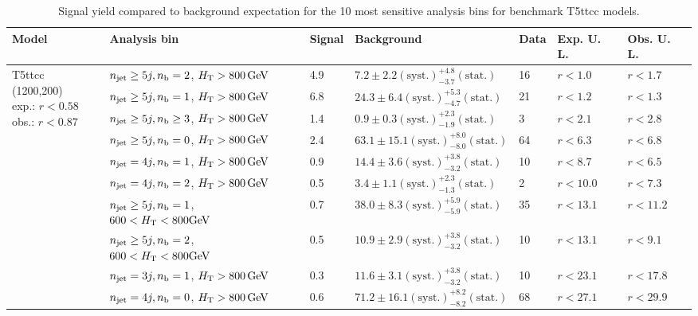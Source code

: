 \begin{table}[h!] 
  \scriptsize
  \caption{ 
Signal yield compared to background expectation for the 10 most sensitive analysis bins 
for benchmark T5ttcc models.
  \label{tab:sigBenchmarksYields_T5ttcc}}
  \centering 
  \begin{tabular}{ lllllll } 
    \hline 
    \hline 
    Model & Analysis bin & Signal & Background & Data & Exp. U. L. & Obs. U. L. \\ \hline
\multirow{10}{*}{\parbox[t]{2cm}{T5ttcc (1200,200)\\exp.: $r<0.58$\\obs.: $r<0.87$}}
 & $n_{\mathrm{jet}} \geq5j,n_{\text{b}} =2$, $\mbox{$H_\text{T}$} > 800 \, \mathrm{GeV}$ & 4.9 & $7.2 \pm 2.2 \mathrm{(syst.)} ^{+4.8}_{-3.7} \mathrm{(stat.)}$ & 16 & $r < 1.0$ & $r < 1.7$\\ 
 & $n_{\mathrm{jet}} \geq5j,n_{\text{b}} =1$, $\mbox{$H_\text{T}$} > 800 \, \mathrm{GeV}$ & 6.8 & $24.3 \pm 6.4 \mathrm{(syst.)} ^{+5.3}_{-4.7} \mathrm{(stat.)}$ & 21 & $r < 1.2$ & $r < 1.3$\\ 
 & $n_{\mathrm{jet}} \geq5j,n_{\text{b}} \geq3$, $\mbox{$H_\text{T}$} > 800 \, \mathrm{GeV}$ & 1.4 & $0.9 \pm 0.3 \mathrm{(syst.)} ^{+2.3}_{-1.9} \mathrm{(stat.)}$ & 3 & $r < 2.1$ & $r < 2.8$\\ 
 & $n_{\mathrm{jet}} \geq5j,n_{\text{b}} =0$, $\mbox{$H_\text{T}$} > 800 \, \mathrm{GeV}$ & 2.4 & $63.1 \pm 15.1 \mathrm{(syst.)} ^{+8.0}_{-8.0} \mathrm{(stat.)}$ & 64 & $r < 6.3$ & $r < 6.8$\\ 
 & $n_{\mathrm{jet}} =4j,n_{\text{b}} =1$, $\mbox{$H_\text{T}$} > 800 \, \mathrm{GeV}$ & 0.9 & $14.4 \pm 3.6 \mathrm{(syst.)} ^{+3.8}_{-3.2} \mathrm{(stat.)}$ & 10 & $r < 8.7$ & $r < 6.5$\\ 
 & $n_{\mathrm{jet}} =4j,n_{\text{b}} =2$, $\mbox{$H_\text{T}$} > 800 \, \mathrm{GeV}$ & 0.5 & $3.4 \pm 1.1 \mathrm{(syst.)} ^{+2.3}_{-1.3} \mathrm{(stat.)}$ & 2 & $r < 10.0$ & $r < 7.3$\\ 
 & $n_{\mathrm{jet}} \geq5j,n_{\text{b}} =1$, $600 < \mbox{$H_\text{T}$} < 800 \mathrm{GeV}$ & 0.7 & $38.0 \pm 8.3 \mathrm{(syst.)} ^{+5.9}_{-5.9} \mathrm{(stat.)}$ & 35 & $r < 13.1$ & $r < 11.2$\\ 
 & $n_{\mathrm{jet}} \geq5j,n_{\text{b}} =2$, $600 < \mbox{$H_\text{T}$} < 800 \mathrm{GeV}$ & 0.5 & $10.9 \pm 2.9 \mathrm{(syst.)} ^{+3.8}_{-3.2} \mathrm{(stat.)}$ & 10 & $r < 13.1$ & $r < 9.1$\\ 
 & $n_{\mathrm{jet}} =3j,n_{\text{b}} =1$, $\mbox{$H_\text{T}$} > 800 \, \mathrm{GeV}$ & 0.3 & $11.6 \pm 3.1 \mathrm{(syst.)} ^{+3.8}_{-3.2} \mathrm{(stat.)}$ & 10 & $r < 23.1$ & $r < 17.8$\\ 
 & $n_{\mathrm{jet}} =4j,n_{\text{b}} =0$, $\mbox{$H_\text{T}$} > 800 \, \mathrm{GeV}$ & 0.6 & $71.2 \pm 16.1 \mathrm{(syst.)} ^{+8.2}_{-8.2} \mathrm{(stat.)}$ & 68 & $r < 27.1$ & $r < 29.9$\\ \hline

\end{tabular}
\end{table}
